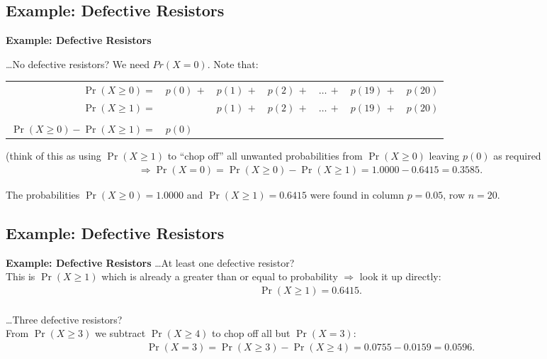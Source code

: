 \documentclass[compress]{beamer}        %
\makeatletter
\newcommand{\tcb}{\textcolor{beamer@blendedblue}}
\makeatother
\begin{document}
\subsection{Example: Defective Resistors}
\begin{frame}{\bf \tcb{Example: Defective Resistors}}

\ldots No defective resistors? We need $Pr(X=0)$. Note that:\\[0.5cm]

\begin{center}
\begin{tabular}{rl@{\,}l@{\,}l@{\,}l@{\,}l@{\,}l}
$\Pr(X \ge 0) =$ & $p(0)\,+$ & $p(1)\,+$ & $p(2)\,+$ & $\ldots\,+$ & $p(19)\,+$ & $p(20)$ \\[0.1cm]
$\Pr(X \ge 1) =$ &           & $p(1)\,+$ & $p(2)\,+$ & $\ldots\,+$ & $p(19)\,+$ & $p(20)$ \\[0.1cm]
\hline
&&&&&&\\[-0.4cm]
$\Pr(X \ge 0) - \Pr(X \ge 1) =$ & $p(0)$ &&&&&\\[0.1cm]
\end{tabular}
\end{center}
{\footnotesize(think of this as using $\Pr(X \ge 1)$ to ``chop off'' all unwanted probabilities from $\Pr(X \ge 0)$ leaving $p(0)$ as required}\\

\begin{align*}
\Rightarrow \Pr(X=0) = \Pr(X \ge 0) - \Pr(X \ge 1) = 1.0000 - 0.6415 = 0.3585.
\end{align*}

The probabilities $\Pr(X \ge 0) = 1.0000$ and $\Pr(X \ge 1) = 0.6415$ were found in column $p = 0.05$, row $n = 20$.
\end{frame}


\subsection{Example: Defective Resistors}
\begin{frame}{\bf \tcb{Example: Defective Resistors}}\label{binexampletab}
\ldots At least one defective resistor?\\[0.6cm]
This is $\Pr(X\ge1)$ which is already a greater than or equal to probability $\Rightarrow$ look it up directly:\\[-0.7cm]
\begin{align*}
\Pr(X\ge1) = 0.6415.\\[0.2cm]
\end{align*}

\ldots Three defective resistors?\\[0.6cm]
From $\Pr(X\ge3)$ we subtract $\Pr(X\ge4)$ to chop off all but $\Pr(X=3)$:\\[-0.3cm]
\begin{align*}
\Pr(X=3) = \Pr(X\ge3) - \Pr(X\ge4) = 0.0755 - 0.0159 = 0.0596.\\
\end{align*}


\end{frame}
\end{document}
